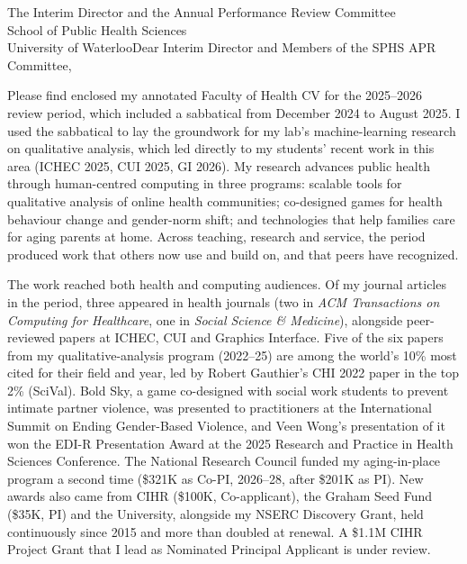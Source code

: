 \begin{aprletter}{%
The Interim Director and the Annual Performance Review Committee\\
School of Public Health Sciences\\
University of Waterloo}{Dear Interim Director and Members of the SPHS APR Committee,}

Please find enclosed my annotated Faculty of Health CV for the 2025--2026 review period, which included a sabbatical from December 2024 to August 2025. I used the sabbatical to lay the groundwork for my lab's machine-learning research on qualitative analysis, which led directly to my students' recent work in this area (ICHEC 2025, CUI 2025, GI 2026). My research advances public health through human-centred computing in three programs: scalable tools for qualitative analysis of online health communities; co-designed games for health behaviour change and gender-norm shift; and technologies that help families care for aging parents at home. Across teaching, research and service, the period produced work that others now use and build on, and that peers have recognized.


The work reached both health and computing audiences. Of my  journal articles in the period, three appeared in health journals (two in \emph{ACM Transactions on Computing for Healthcare}, one in \emph{Social Science \& Medicine}), alongside peer-reviewed papers at ICHEC, CUI and Graphics Interface. Five of the six papers from my qualitative-analysis program (2022--25) are among the world's 10\% most cited for their field and year, led by Robert Gauthier's CHI 2022 paper in the top 2\% (SciVal). Bold Sky, a game co-designed with social work students to prevent intimate partner violence, was presented to practitioners at the International Summit on Ending Gender-Based Violence, and Veen Wong's presentation of it won the EDI-R Presentation Award at the 2025 Research and Practice in Health Sciences Conference. The National Research Council funded my aging-in-place program a second time (\$321K as Co-PI, 2026--28, after \$201K as PI). New awards also came from CIHR (\$100K, Co-applicant), the Graham Seed Fund (\$35K, PI) and the University, alongside my NSERC Discovery Grant, held continuously since 2015 and more than doubled at renewal. A \$1.1M CIHR Project Grant that I lead as Nominated Principal Applicant is under review.



\end{aprletter}

